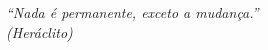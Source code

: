 \documentclass[
	12pt,				%
	oneside,			%
	a4paper,			%
	english,			%
	brazil				%
	]{abntex2ppgsi}
\begin{document}
%
% 
\begin{epigrafe}
    \vspace*{\fill}
	\begin{flushright}
		\textit{``Nada é permanente, exceto a mudança.''\\
		(Heráclito)}
	\end{flushright}
\end{epigrafe}


\setlength{\absparsep}{18pt} %
\end{document}
